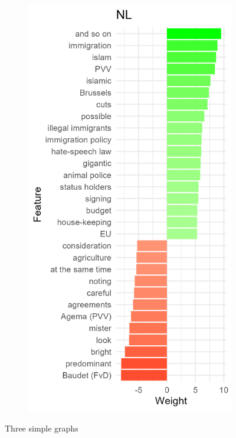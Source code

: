\documentclass{article}
\begin{document}
\begin{figure}
     \begin{subfigure}[b]{0.3\textwidth}
         \centering
         \includegraphics[width=\textwidth]{NL/vis/NL_weights.png}
     \end{subfigure}
        \caption{Three simple graphs}
        \label{fig:three graphs}
\end{figure}
\end{document}

